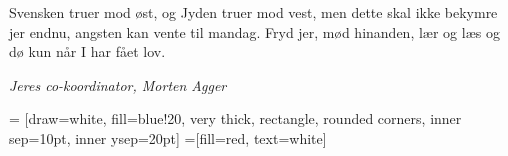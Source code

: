 \begin{minipage}[b]{0.95\linewidth}
\begin{minipage}[t]{0.47\textwidth}
Svensken truer mod øst, og Jyden truer mod vest, men dette skal ikke bekymre jer endnu, angsten kan vente til mandag. Fryd jer, mød hinanden, lær og læs og dø kun når I har fået lov. 

{\flushright\emph{Jeres co-koordinator, Morten Agger}}

\end{minipage}
\hfill\begin{minipage}[t]{0.47\textwidth}

\vspace{1mm}
 = [draw=white, fill=blue!20, very thick,
    rectangle, rounded corners, inner sep=10pt, inner ysep=20pt]
 =[fill=red, text=white]

%


\end{minipage}
\end{minipage}

